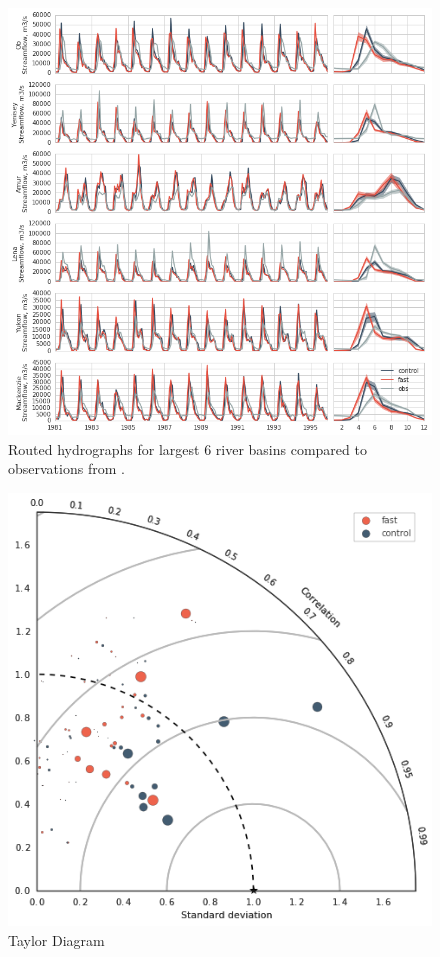 \documentclass[jgrga, draft]{agutex}
\begin{document}
\clearpage
\begin{figure}
\noindent\includegraphics[width=40pc,natwidth=1]{Figure_5}
\caption{Routed hydrographs for largest 6 river basins compared to observations from \citet{Dai_2009}.}
\label{fig:5}
\end{figure}

\clearpage
\begin{figure}
\noindent\includegraphics[width=40pc,natwidth=1]{Figure_6}
\caption{Taylor Diagram}
\label{fig:6}
\end{figure}
\end{document}

